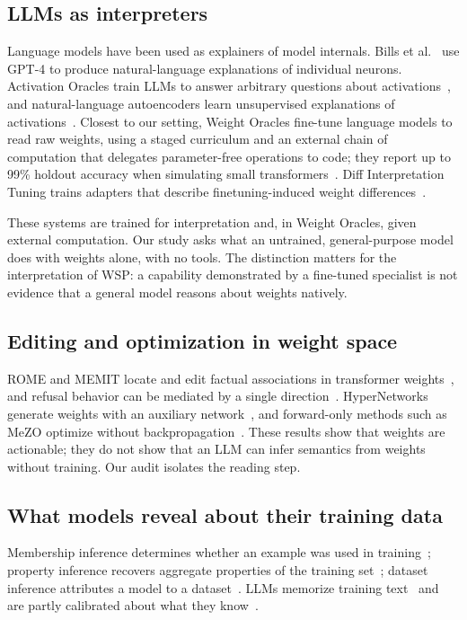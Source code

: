 \documentclass[11pt]{article}
\begin{document}
\subsection{LLMs as interpreters}

Language models have been used as explainers of model internals. Bills et al.~\cite{bills} use GPT-4 to produce natural-language explanations of individual neurons. Activation Oracles train LLMs to answer arbitrary questions about activations~\cite{karvonen}, and natural-language autoencoders learn unsupervised explanations of activations~\cite{fraser}. Closest to our setting, Weight Oracles fine-tune language models to read raw weights, using a staged curriculum and an external chain of computation that delegates parameter-free operations to code; they report up to 99\% holdout accuracy when simulating small transformers~\cite{kabra}. Diff Interpretation Tuning trains adapters that describe finetuning-induced weight differences~\cite{goel}.

These systems are trained for interpretation and, in Weight Oracles, given external computation. Our study asks what an untrained, general-purpose model does with weights alone, with no tools. The distinction matters for the interpretation of WSP: a capability demonstrated by a fine-tuned specialist is not evidence that a general model reasons about weights natively.

\subsection{Editing and optimization in weight space}

ROME and MEMIT locate and edit factual associations in transformer weights~\cite{meng2022,meng2023}, and refusal behavior can be mediated by a single direction~\cite{arditi}. HyperNetworks generate weights with an auxiliary network~\cite{ha}, and forward-only methods such as MeZO optimize without backpropagation~\cite{malladi}. These results show that weights are actionable; they do not show that an LLM can infer semantics from weights without training. Our audit isolates the reading step.

\subsection{What models reveal about their training data}

Membership inference determines whether an example was used in training~\cite{shokri}; property inference recovers aggregate properties of the training set~\cite{ganju}; dataset inference attributes a model to a dataset~\cite{maini}. LLMs memorize training text~\cite{carliniExtract,carliniQuant} and are partly calibrated about what they know~\cite{kadavath}.
\end{document}
